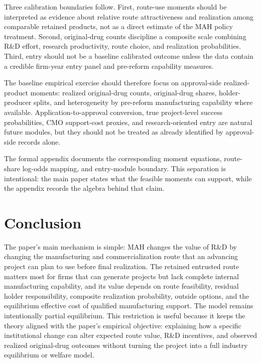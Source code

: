 \documentclass[12pt]{article}
\newcommand{\1}{\mathbf{1}}
\begin{document}
Three calibration boundaries follow. First, route-use moments should be interpreted as evidence about relative route attractiveness and realization among comparable retained products, not as a direct estimate of the MAH policy treatment. Second, original-drug counts discipline a composite scale combining R\&D effort, research productivity, route choice, and realization probabilities. Third, entry should not be a baseline calibrated outcome unless the data contain a credible firm-year entry panel and pre-reform capability measures.

The baseline empirical exercise should therefore focus on approval-side realized-product moments: realized original-drug counts, original-drug shares, holder-producer splits, and heterogeneity by pre-reform manufacturing capability where available. Application-to-approval conversion, true project-level success probabilities, CMO support-cost proxies, and research-oriented entry are natural future modules, but they should not be treated as already identified by approval-side records alone.

The formal appendix documents the corresponding moment equations, route-share log-odds mapping, and entry-module boundary. This separation is intentional: the main paper states what the feasible moments can support, while the appendix records the algebra behind that claim.

\section{Conclusion}

The paper's main mechanism is simple: MAH changes the value of R\&D by changing the manufacturing and commercialization route that an advancing project can plan to use before final realization. The retained entrusted route matters most for firms that can generate projects but lack complete internal manufacturing capability, and its value depends on route feasibility, residual holder responsibility, composite realization probability, outside options, and the equilibrium effective cost of qualified manufacturing support. The model remains intentionally partial equilibrium. This restriction is useful because it keeps the theory aligned with the paper's empirical objective: explaining how a specific institutional change can alter expected route value, R\&D incentives, and observed realized original-drug outcomes without turning the project into a full industry equilibrium or welfare model.

\clearpage


\end{document}
